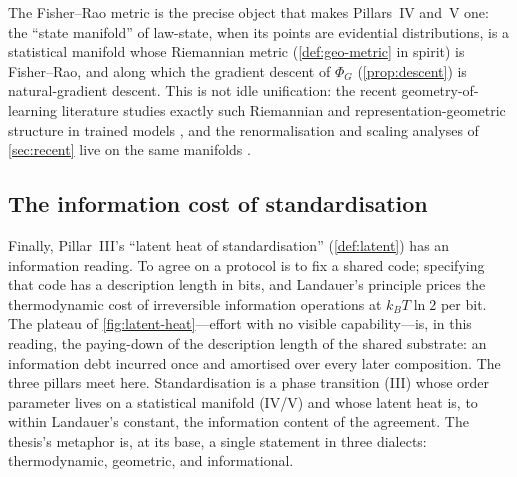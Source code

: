 The Fisher--Rao metric is the precise object that makes Pillars~IV and~V one: the
``state manifold'' of law-state, when its points are evidential distributions, is a
statistical manifold whose Riemannian metric (\cref{def:geo-metric} in spirit) is
Fisher--Rao, and along which the gradient descent of $\Phi_G$ (\cref{prop:descent})
is natural-gradient descent. This is not idle unification: the recent geometry-of-
learning literature studies exactly such Riemannian and representation-geometric
structure in trained models \citep{david25,yadav26}, and the renormalisation and
scaling analyses of \cref{sec:recent} live on the same manifolds
\citep{tan26rg,montanari26}.

\subsection{The information cost of standardisation}
\label{sec:meas-landauer}

Finally, Pillar~III's ``latent heat of standardisation'' (\cref{def:latent}) has an
information reading. To agree on a protocol is to fix a shared code; specifying that
code has a description length in bits, and Landauer's principle prices the
thermodynamic cost of irreversible information operations at $k_B T\ln 2$ per bit.
The plateau of \cref{fig:latent-heat}---effort with no visible capability---is, in
this reading, the paying-down of the description length of the shared substrate: an
information debt incurred once and amortised over every later composition. The three
pillars meet here. Standardisation is a phase transition (III) whose order parameter
lives on a statistical manifold (IV/V) and whose latent heat is, to within
Landauer's constant, the information content of the agreement. The thesis's metaphor
is, at its base, a single statement in three dialects: thermodynamic, geometric, and
informational.
